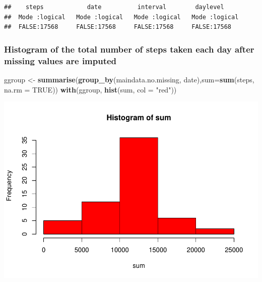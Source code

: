 \documentclass[]{article}
\newenvironment{Shaded}{\begin{snugshade}}{\end{snugshade}}
\newcommand{\KeywordTok}[1]{\textcolor[rgb]{0.13,0.29,0.53}{\textbf{#1}}}
\newcommand{\DataTypeTok}[1]{\textcolor[rgb]{0.13,0.29,0.53}{#1}}
\newcommand{\DecValTok}[1]{\textcolor[rgb]{0.00,0.00,0.81}{#1}}
\newcommand{\StringTok}[1]{\textcolor[rgb]{0.31,0.60,0.02}{#1}}
\newcommand{\OtherTok}[1]{\textcolor[rgb]{0.56,0.35,0.01}{#1}}
\newcommand{\ControlFlowTok}[1]{\textcolor[rgb]{0.13,0.29,0.53}{\textbf{#1}}}
\newcommand{\OperatorTok}[1]{\textcolor[rgb]{0.81,0.36,0.00}{\textbf{#1}}}
\newcommand{\NormalTok}[1]{#1}
\begin{document}
\begin{Shaded}
\end{Shaded}

\begin{verbatim}
##    steps            date          interval        daylevel      
##  Mode :logical   Mode :logical   Mode :logical   Mode :logical  
##  FALSE:17568     FALSE:17568     FALSE:17568     FALSE:17568
\end{verbatim}

\subsubsection{Histogram of the total number of steps taken each day
after missing values are
imputed}\label{histogram-of-the-total-number-of-steps-taken-each-day-after-missing-values-are-imputed}

\begin{Shaded}
\begin{Highlighting}[]
\NormalTok{ggroup <-}\StringTok{ }\KeywordTok{summarise}\NormalTok{(}\KeywordTok{group_by}\NormalTok{(maindata.no.missing, date),}\DataTypeTok{sum=}\KeywordTok{sum}\NormalTok{(steps, }\DataTypeTok{na.rm =} \OtherTok{TRUE}\NormalTok{))}
\KeywordTok{with}\NormalTok{(ggroup, }\KeywordTok{hist}\NormalTok{(sum, }\DataTypeTok{col =} \StringTok{"red"}\NormalTok{))}
\end{Highlighting}
\end{Shaded}

\includegraphics{PA1_template_files/figure-latex/unnamed-chunk-16-1.pdf}
\end{document}
